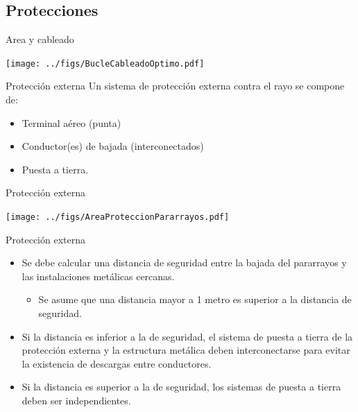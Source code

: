 \documentclass[aspectratio=169, usenames,svgnames,dvipsnames]{beamer}
\begin{document}
\subsection{Protecciones}
\label{sec:org055a1bd}


\begin{frame}[label={sec:org071d882}]{Area y cableado}
\begin{center}
\texttt{[image: ../figs/BucleCableadoOptimo.pdf]}
\end{center}
\end{frame}

\begin{frame}[label={sec:orgcb0c1a4}]{Protección externa}
Un sistema de protección externa contra el rayo se compone de:

\begin{itemize}
\item Terminal aéreo (punta)

\item Conductor(es) de bajada (interconectados)

\item Puesta a tierra.
\end{itemize}
\end{frame}

\begin{frame}[label={sec:org0db80d3}]{Protección externa}
\begin{center}
\texttt{[image: ../figs/AreaProteccionPararrayos.pdf]}
\end{center}
\end{frame}

\begin{frame}[label={sec:org419465d}]{Protección externa}
\begin{itemize}
\item Se debe calcular una \alert{distancia de seguridad} entre la bajada del
pararrayos y las instalaciones metálicas cercanas.

\begin{itemize}
\item Se asume que una distancia mayor a 1 metro es superior a la distancia
de seguridad.
\end{itemize}

\item \alert{Si la distancia es inferior a la de seguridad}, el sistema de puesta
a tierra de la protección externa y la estructura metálica deben
\alert{interconectarse} para evitar la existencia de descargas entre
conductores.

\item \alert{Si la distancia es superior a la de seguridad}, los sistemas de
puesta a tierra deben ser \alert{independientes}.
\end{itemize}
\end{frame}
\end{document}
